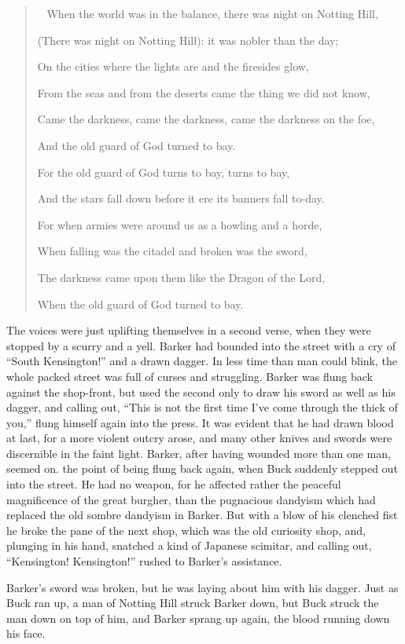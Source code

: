 \documentclass{book}
\newenvironment{mdblockquote}{%
  \begin{quotation}
    \
}{%
  \end{quotation}
}
\begin{document}
\begin{mdblockquote}
	When the world was in the balance, there was night on Notting Hill,

	(There was night on Notting Hill): it was nobler than the day;

	On the cities where the lights are and the firesides glow,

	From the seas and from the deserts came the thing we did not know,

	Came the darkness, came the darkness, came the darkness on the foe,

	And the old guard of God turned to bay.

	For the old guard of God turns to bay, turns to bay,

	And the stars fall down before it ere its banners fall to-day.

	For when armies were around us as a howling and a horde,

	When falling was the citadel and broken was the sword,

	The darkness came upon them like the Dragon of the Lord,

	When the old guard of God turned to bay.


\end{mdblockquote}
The voices were just uplifting themselves in a second verse, when they were stopped by a scurry and a yell. Barker had bounded into the street with a cry of “South Kensington!” and a drawn dagger. In less time than man could blink, the whole packed street was full of curses and struggling. Barker was flung back against the shop-front, but used the second only to draw his sword as well as his dagger, and calling out, “This is not the first time I’ve come through the thick of you,” flung himself again into the press. It was evident that he had drawn blood at last, for a more violent outcry arose, and many other knives and swords were discernible in the faint light. Barker, after having wounded more than one man, seemed on. the point of being flung back again, when Buck suddenly stepped out into the street. He had no weapon, for he affected rather the peaceful magnificence of the great burgher, than the pugnacious dandyism which had replaced the old sombre dandyism in Barker. But with a blow of his clenched fist he broke the pane of the next shop, which was the old curiosity shop, and, plunging in his hand, snatched a kind of Japanese scimitar, and calling out, “Kensington! Kensington!” rushed to Barker’s assistance.

Barker’s sword was broken, but he was laying about him with his dagger. Just as Buck ran up, a man of Notting Hill struck Barker down, but Buck struck the man down on top of him, and Barker sprang up again, the blood running down his face.
\end{document}

